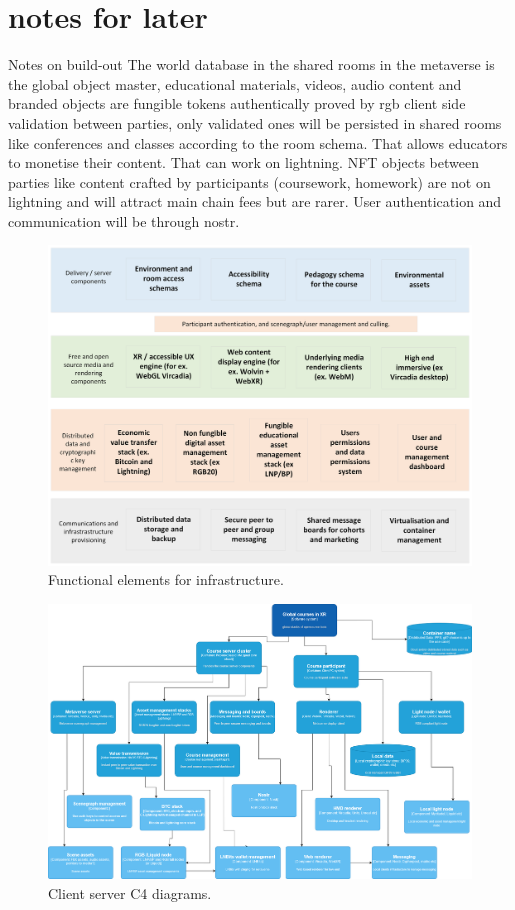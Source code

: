 
\section{notes for later}
Notes on build-out
The world database in the shared rooms in the metaverse is the global object master,  educational materials, videos,  audio content and branded objects are fungible tokens authentically proved by rgb client side validation between parties,  only validated ones will be persisted in shared rooms like conferences and classes according to the room schema. That allows educators to monetise their content.  That can work on lightning.  NFT objects between parties like content crafted by participants (coursework, homework) are not on lightning and will attract main chain fees but are rarer. User authentication and communication will be through nostr.

\begin{figure}[ht]\centering %
	\includegraphics{globalclassroom}
	\caption{Functional elements for infrastructure.}
	\label{fig:globalclassroom}
\end{figure}

\begin{figure}[ht]\centering %
	\includegraphics{systemc4}
	\caption{Client server C4 diagrams.}
	\label{fig:globalclassroom}
\end{figure}

